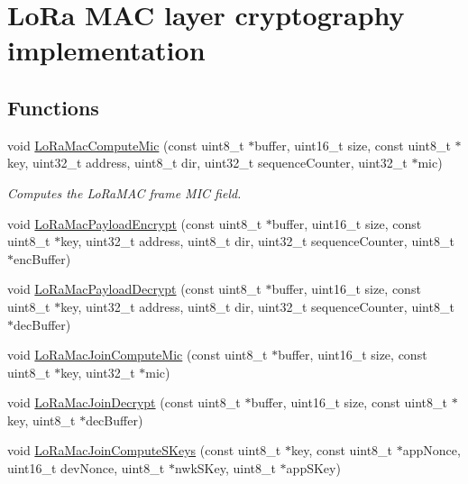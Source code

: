 \hypertarget{group__LORAMAC__CRYPTO}{}\section{Lo\+Ra M\+AC layer cryptography implementation}
\label{group__LORAMAC__CRYPTO}
\subsection*{Functions}
\begin{DoxyCompactItemize}
\item 
void \hyperlink{group__LORAMAC__CRYPTO_ga6ee265070494b83255e7fdc4dff985da}{Lo\+Ra\+Mac\+Compute\+Mic} (const uint8\+\_\+t $\ast$buffer, uint16\+\_\+t size, const uint8\+\_\+t $\ast$key, uint32\+\_\+t address, uint8\+\_\+t dir, uint32\+\_\+t sequence\+Counter, uint32\+\_\+t $\ast$mic)
\begin{DoxyCompactList}\small\item\em Computes the Lo\+Ra\+M\+AC frame M\+IC field. \end{DoxyCompactList}\item 
void \hyperlink{group__LORAMAC__CRYPTO_ga50339e60abea2186ca7e584b489718b1}{Lo\+Ra\+Mac\+Payload\+Encrypt} (const uint8\+\_\+t $\ast$buffer, uint16\+\_\+t size, const uint8\+\_\+t $\ast$key, uint32\+\_\+t address, uint8\+\_\+t dir, uint32\+\_\+t sequence\+Counter, uint8\+\_\+t $\ast$enc\+Buffer)
\item 
void \hyperlink{group__LORAMAC__CRYPTO_ga41f9ba19f61b195420914ed58c8b94c7}{Lo\+Ra\+Mac\+Payload\+Decrypt} (const uint8\+\_\+t $\ast$buffer, uint16\+\_\+t size, const uint8\+\_\+t $\ast$key, uint32\+\_\+t address, uint8\+\_\+t dir, uint32\+\_\+t sequence\+Counter, uint8\+\_\+t $\ast$dec\+Buffer)
\item 
void \hyperlink{group__LORAMAC__CRYPTO_gac9216af326316c9e7f207d4e73aed199}{Lo\+Ra\+Mac\+Join\+Compute\+Mic} (const uint8\+\_\+t $\ast$buffer, uint16\+\_\+t size, const uint8\+\_\+t $\ast$key, uint32\+\_\+t $\ast$mic)
\item 
void \hyperlink{group__LORAMAC__CRYPTO_gac2379cd7cbeb6febaa2a7be5d9f04b5c}{Lo\+Ra\+Mac\+Join\+Decrypt} (const uint8\+\_\+t $\ast$buffer, uint16\+\_\+t size, const uint8\+\_\+t $\ast$key, uint8\+\_\+t $\ast$dec\+Buffer)
\item 
void \hyperlink{group__LORAMAC__CRYPTO_gad6fc2ace27fa388ec860fc2e5ae1f544}{Lo\+Ra\+Mac\+Join\+Compute\+S\+Keys} (const uint8\+\_\+t $\ast$key, const uint8\+\_\+t $\ast$app\+Nonce, uint16\+\_\+t dev\+Nonce, uint8\+\_\+t $\ast$nwk\+S\+Key, uint8\+\_\+t $\ast$app\+S\+Key)
\end{DoxyCompactItemize}


